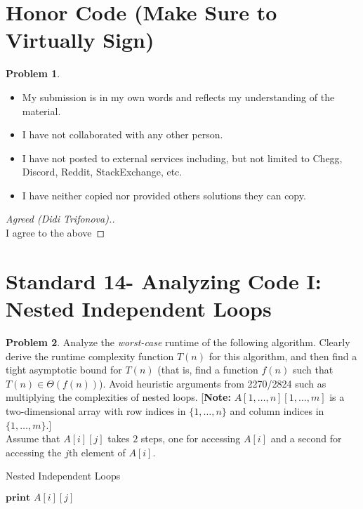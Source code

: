 \documentclass[11pt]{article}
\theoremstyle{definition}
\theoremstyle{definition}
\newtheorem{required}{Problem}
\theoremstyle{definition}
\begin{document}
\section{Honor Code (Make Sure to Virtually Sign)} \label{HonorCode}

\begin{required}
\noindent 
\begin{itemize}
\item My submission is in my own words and reflects my understanding of the material.
\item I have not collaborated with any other person.
\item I have not posted to external services including, but not limited to Chegg, Discord, Reddit, StackExchange, etc.
\item I have neither copied nor provided others solutions they can copy.
\end{itemize}

\end{required}

\begin{proof}[Agreed (Didi Trifonova).] \\
I agree to the above
\end{proof}


\newpage
\section{Standard 14- Analyzing Code I: Nested Independent Loops}
\begin{required}
Analyze the \textit{worst-case} runtime of the following algorithm. Clearly derive the runtime complexity function $T(n)$ for this algorithm, and then find a tight asymptotic bound for $T(n)$ (that is, find a function $f(n)$ such that $T(n) \in \Theta(f(n))$). Avoid heuristic arguments from 2270/2824 such as multiplying the complexities of nested loops. [\textbf{Note:} $A[1, \ldots, n][1, \ldots, m]$ is a two-dimensional array with row indices in $\{1, \ldots, n\}$ and column indices in $\{1, \ldots, m\}$.] \\

\noindent Assume that $A[i][j]$ takes $2$ steps, one for accessing $A[i]$ and a second for accessing the $j$th element of $A[i]$.

\begin{algorithm}
\caption{Nested Independent Loops}\label{alg:NestedIndependent}
\begin{algorithmic}[1]
		\State $\textbf{print } A[i][j]$
	\EndFor
\EndFor
\EndProcedure
\end{algorithmic}
\end{algorithm}
\end{required}
\end{document}
